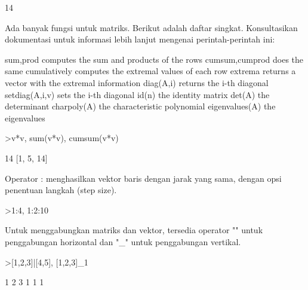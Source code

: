 \documentclass[a4paper,10pt]{article}
\begin{document}
\begin{eulernotebook}
\begin{eulercomment}
\begin{eulercomment}
\begin{eulercomment}
\begin{eulercomment}
\begin{eulercomment}
\begin{eulercomment}
\begin{eulercomment}
\begin{eulercomment}
\begin{eulercomment}
\begin{eulercomment}
\begin{eulercomment}
\begin{eulercomment}
\begin{eulercomment}
\begin{eulercomment}
\begin{eulercomment}
\begin{eulercomment}
\begin{eulercomment}
\begin{eulercomment}
\begin{eulercomment}
\begin{eulercomment}
\begin{euleroutput}
  14
\end{euleroutput}
\begin{eulercomment}
Ada banyak fungsi untuk matriks. Berikut adalah daftar singkat.
Konsultasikan dokumentasi untuk informasi lebih lanjut mengenai
perintah-perintah ini:

\end{eulercomment}
\begin{eulerttcomment}
    sum,prod computes the sum and products of the rows
    cumsum,cumprod does the same cumulatively
    computes the extremal values of each row
    extrema returns a vector with the extremal information
    diag(A,i) returns the i-th diagonal
    setdiag(A,i,v) sets the i-th diagonal
    id(n) the identity matrix
    det(A) the determinant
    charpoly(A) the characteristic polynomial
    eigenvalues(A) the eigenvalues
\end{eulerttcomment}
\begin{eulerprompt}
>v*v, sum(v*v), cumsum(v*v)
\end{eulerprompt}
\begin{euleroutput}
  [1,  4,  9]
  14
  [1,  5,  14]
\end{euleroutput}
\begin{eulercomment}
Operator : menghasilkan vektor baris dengan jarak yang sama, dengan
opsi penentuan langkah (step size).
\end{eulercomment}
\begin{eulerprompt}
>1:4, 1:2:10
\end{eulerprompt}
\begin{euleroutput}
  [1,  2,  3,  4]
  [1,  3,  5,  7,  9]
\end{euleroutput}
\begin{eulercomment}
Untuk menggabungkan matriks dan vektor, tersedia operator "\textbar{}" untuk
penggabungan horizontal dan "\_" untuk penggabungan vertikal.
\end{eulercomment}
\begin{eulerprompt}
>[1,2,3]|[4,5], [1,2,3]_1
\end{eulerprompt}
\begin{euleroutput}
  [1,  2,  3,  4,  5]
              1             2             3 
              1             1             1 
\end{euleroutput}
\begin{eulercomment}

\end{eulercomment}
\end{eulercomment}
\end{eulercomment}
\end{eulercomment}
\end{eulercomment}
\end{eulercomment}
\end{eulercomment}
\end{eulercomment}
\end{eulercomment}
\end{eulercomment}
\end{eulercomment}
\end{eulercomment}
\end{eulercomment}
\end{eulercomment}
\end{eulercomment}
\end{eulercomment}
\end{eulercomment}
\end{eulercomment}
\end{eulercomment}
\end{eulercomment}
\end{eulercomment}
\end{eulernotebook}
\end{document}
